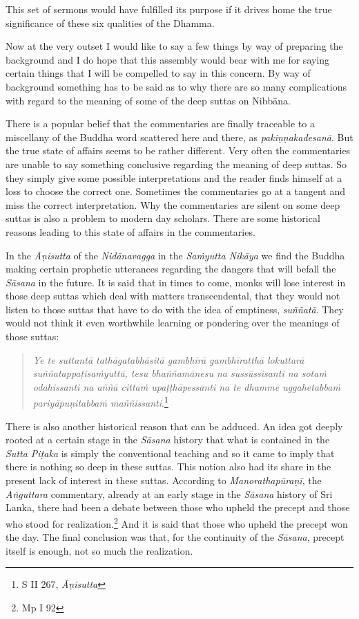 This set of sermons would have fulfilled its purpose if it drives home the true significance of these six qualities of the Dhamma.

Now at the very outset I would like to say a few things by way of preparing the background and I do hope that this assembly would bear with me for saying certain things that I will be compelled to say in this concern. By way of background something has to be said as to why there are so many complications with regard to the meaning of some of the deep suttas on Nibbāna.

There is a popular belief that the commentaries are finally traceable to a miscellany of the Buddha word scattered here and there, as \emph{pakiṇṇakadesanā}. But the true state of affairs seems to be rather different. Very often the commentaries are unable to say something conclusive regarding the meaning of deep suttas. So they simply give some possible interpretations and the reader finds himself at a loss to choose the correct one. Sometimes the commentaries go at a tangent and miss the correct interpretation. Why the commentaries are silent on some deep suttas is also a problem to modern day scholars. There are some historical reasons leading to this state of affairs in the commentaries.

In the \emph{Āṇisutta} of the \emph{Nidānavagga} in the \emph{Saṁyutta Nikāya} we find the Buddha making certain prophetic utterances regarding the dangers that will befall the \emph{Sāsana} in the future. It is said that in times to come, monks will lose interest in those deep suttas which deal with matters transcendental, that they would not listen to those suttas that have to do with the idea of emptiness, \emph{suññatā}. They would not think it even worthwhile learning or pondering over the meanings of those suttas:

\begin{quote}
\emph{Ye te suttantā tathāgatabhāsitā gambhīrā gambhīratthā lokuttarā suññatappaṭisaṁyuttā, tesu bhaññamānesu na sussūssisanti na sotaṁ odahissanti na aññā cittaṁ upaṭṭhāpessanti na te dhamme uggahetabbaṁ pariyāpuṇitabbaṁ maññissanti}.\footnote{S II 267, \emph{Āṇisutta}}
\end{quote}

There is also another historical reason that can be adduced. An idea got deeply rooted at a certain stage in the \emph{Sāsana} history that what is contained in the \emph{Sutta Piṭaka} is simply the conventional teaching and so it came to imply that there is nothing so deep in these suttas. This notion also had its share in the present lack of interest in these suttas. According to \emph{Manorathapūraṇī}, the \emph{Aṅguttara} commentary, already at an early stage in the \emph{Sāsana} history of Sri Lanka, there had been a debate between those who upheld the precept and those who stood for realization.\footnote{Mp I 92} And it is said that those who upheld the precept won the day. The final conclusion was that, for the continuity of the \emph{Sāsana}, precept itself is enough, not so much the realization.

